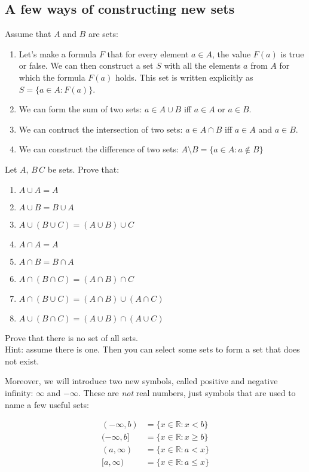 \subsection{A few ways of constructing new sets}
\noindent Assume that $A$ and $B$ are sets:
\begin{enumerate}
	\item Let's make a formula $F$ that for every element $a\in A$, the value 
		$F(a)$ is true or false. We can then construct a set $S$ with all the elements $a$ from $A$ for which 
		the formula $F(a)$ holds. This set is written explicitly as $S=\{a\in A : F(a)\}$.
	\item We can form the sum of two sets: $a \in A\cup B$ iff $a\in A$ or $a\in B$.
	\item We can contruct the intersection of two sets: $a\in A\cap B$ iff $a\in A$ and $a \in B$.
	\item We can construct the difference of two sets: $A\setminus B = \{a \in A : a\notin B\}$
\end{enumerate}

\begin{prob}
	Let $A,\,B\,C$ be sets. Prove that: 
	\begin{enumerate}
		\item $A\cup A=A$
		\item $A\cup B=B\cup A$
		\item $A\cup (B\cup C)=(A\cup B)\cup C$
		\item $A\cap A=A$
		\item $A\cap B=B\cap A$
		\item $A\cap (B\cap C)=(A\cap B)\cap C$
		\item $A\cap (B\cup C)=(A\cap B)\cup (A\cap C)$
		\item $A\cup (B\cap C)=(A\cup B)\cap (A\cup C)$
	\end{enumerate}
\end{prob}

\begin{prob}
	Prove that there is no set of all sets.\\
	Hint: assume there is one. Then you can select some sets to form a set that does not exist.
\end{prob}

\noindent Moreover, we will introduce two new symbols, called positive and negative infinity: 
$\infty$ and $-\infty$. 
These are \textit{not} real numbers, just symbols that are used to name a few useful sets:

\begin{align*}
	(-\infty,b) &= \{x\in \mathbb R : x < b\}\\
	(-\infty,b] &= \{x\in \mathbb R : x \ge b\}\\
	(a,\infty)  &= \{x\in \mathbb R : a < x\}\\
	[a,\infty)  &= \{x\in \mathbb R : a \le x\}
\end{align*}

